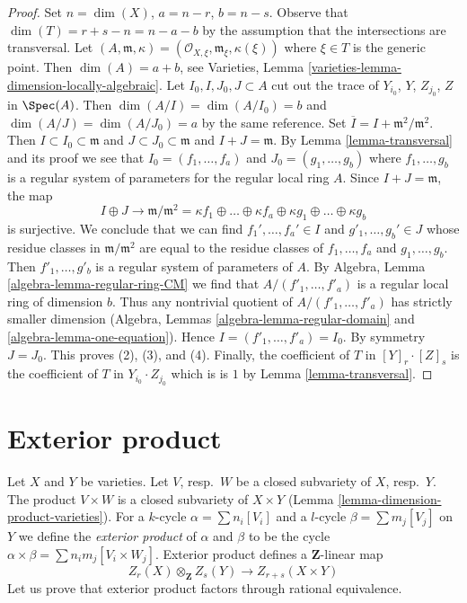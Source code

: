 \begin{proof}
Set $n = \dim(X)$, $a = n - r$, $b = n - s$. Observe that
$\dim(T) = r + s - n = n - a - b$ by the assumption that the
intersections are transversal. Let $(A, \mathfrak m, \kappa) =
(\mathcal{O}_{X, \xi}, \mathfrak m_\xi, \kappa(\xi))$ where $\xi \in T$
is the generic point. Then $\dim(A) = a + b$, see
Varieties, Lemma \ref{varieties-lemma-dimension-locally-algebraic}.
Let $I_0, I, J_0, J \subset A$ cut out the trace of
$Y_{i_0}$, $Y$, $Z_{j_0}$, $Z$ in $\Spec(A)$.
Then $\dim(A/I) = \dim(A/I_0) = b$ and $\dim(A/J) = \dim(A/J_0) = a$
by the same reference. Set $\overline{I} = I + \mathfrak m^2/\mathfrak m^2$.
Then $I \subset I_0 \subset \mathfrak m$ and
$J \subset J_0 \subset \mathfrak m$ and $I + J = \mathfrak m$.
By Lemma \ref{lemma-transversal} and its proof we see that
$I_0 = (f_1, \ldots, f_a)$ and $J_0 = (g_1, \ldots, g_b)$
where $f_1, \ldots, g_b$ is a regular system of parameters
for the regular local ring $A$. Since $I + J = \mathfrak m$, the map
$$
I \oplus J \to
\mathfrak m/\mathfrak m^2 =
\kappa f_1
\oplus \ldots \oplus
\kappa f_a
\oplus
\kappa g_1
\oplus \ldots \oplus
\kappa g_b
$$
is surjective. We conclude that we can find
$f_1', \ldots, f_a' \in I$ and $g'_1, \ldots, g_b' \in J$
whose residue classes in $\mathfrak m/\mathfrak m^2$ are equal to the
residue classes of $f_1, \ldots, f_a$ and $g_1, \ldots, g_b$.
Then $f'_1, \ldots, g'_b$ is a regular system of parameters of $A$.
By Algebra, Lemma \ref{algebra-lemma-regular-ring-CM} we find that
$A/(f'_1, \ldots, f'_a)$ is a regular local ring of dimension $b$.
Thus any nontrivial quotient of $A/(f'_1, \ldots, f'_a)$
has strictly smaller dimension
(Algebra, Lemmas \ref{algebra-lemma-regular-domain} and
\ref{algebra-lemma-one-equation}). Hence $I = (f'_1, \ldots, f'_a) = I_0$.
By symmetry $J = J_0$. This proves (2), (3), and (4).
Finally, the coefficient of $T$ in $[Y]_r \cdot [Z]_s$
is the coefficient of $T$ in $Y_{i_0} \cdot Z_{j_0}$ which is
is $1$ by Lemma \ref{lemma-transversal}.
\end{proof}



\section{Exterior product}
\label{section-exterior-product}

\noindent
Let $X$ and $Y$ be varieties.
Let $V$, resp.\ $W$ be a closed subvariety of $X$, resp.\ $Y$.
The product $V\times W$ is a closed subvariety of $X\times Y$
(Lemma \ref{lemma-dimension-product-varieties}).
For a $k$-cycle $\alpha = \sum n_i [V_i]$ and a $l$-cycle
$\beta = \sum m_j [V_j]$ on $Y$ we define the
{\it exterior product} of $\alpha$ and $\beta$ to be the cycle
$\alpha \times \beta = \sum n_i m_j [V_i \times W_j]$.
Exterior product defines a $\mathbf{Z}$-linear map
$$
Z_r(X) \otimes_\mathbf{Z} Z_s(Y) \longrightarrow Z_{r + s}(X \times Y)
$$
Let us prove that exterior product factors through rational equivalence.

